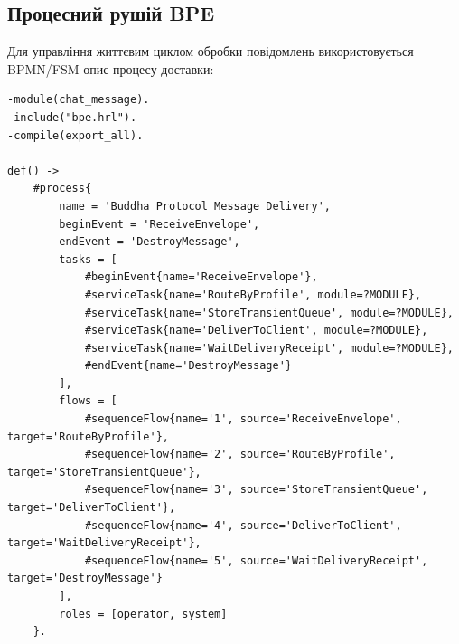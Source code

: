\subsection{Процесний рушій BPE}
Для управління життєвим циклом обробки повідомлень використовується BPMN/FSM опис процесу доставки:
\begin{lstlisting}
-module(chat_message).
-include("bpe.hrl").
-compile(export_all).

def() ->
    #process{
        name = 'Buddha Protocol Message Delivery',
        beginEvent = 'ReceiveEnvelope',
        endEvent = 'DestroyMessage',
        tasks = [
            #beginEvent{name='ReceiveEnvelope'},
            #serviceTask{name='RouteByProfile', module=?MODULE},
            #serviceTask{name='StoreTransientQueue', module=?MODULE},
            #serviceTask{name='DeliverToClient', module=?MODULE},
            #serviceTask{name='WaitDeliveryReceipt', module=?MODULE},
            #endEvent{name='DestroyMessage'}
        ],
        flows = [
            #sequenceFlow{name='1', source='ReceiveEnvelope', target='RouteByProfile'},
            #sequenceFlow{name='2', source='RouteByProfile', target='StoreTransientQueue'},
            #sequenceFlow{name='3', source='StoreTransientQueue', target='DeliverToClient'},
            #sequenceFlow{name='4', source='DeliverToClient', target='WaitDeliveryReceipt'},
            #sequenceFlow{name='5', source='WaitDeliveryReceipt', target='DestroyMessage'}
        ],
        roles = [operator, system]
    }.
\end{lstlisting}

